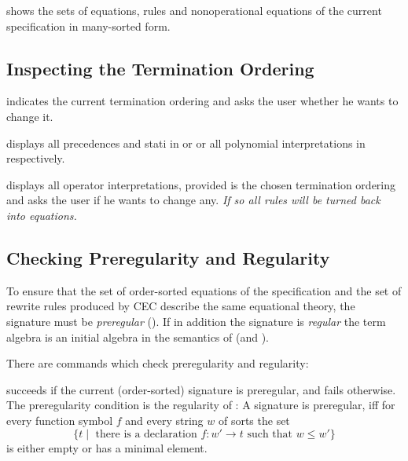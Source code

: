 \begin{command}
shows the sets of equations, rules and nonoperational equations of the 
current specification in many-sorted form.
\end{command}

\subsection{Inspecting the Termination Ordering}
\label{InspecTermination}

\begin{command}
indicates the current termination ordering and asks the user whether he wants to 
change it.
\end{command}

\begin{command}
displays all precedences and stati in  or  or
all polynomial interpretations in  respectively.
\end{command}

\begin{command}
displays all operator interpretations, provided  is the chosen termination
ordering and asks the user if he wants to change any. {\em If so all rules will be turned 
back into equations.}
\end{command}


\subsection{Checking Preregularity and Regularity}

To ensure that the set of order-sorted equations of the specification and
the set of rewrite rules produced by CEC describe the same equational
theory, the signature must be {\em preregular} ( \cite{SNGM87}).
If in addition the signature is {\em regular} the term algebra is an
initial algebra in the semantics of \cite{GM87} (and \cite{SNGM87}).

\noindent
There are commands which check preregularity and regularity:\medskip

\begin{command}
succeeds if the current (order-sorted) signature is preregular,
and fails otherwise.\\
The preregularity condition is the regularity of 
\cite{SNGM87}:
A signature is preregular, iff for every function symbol
$f$ and every string $w$ of sorts the set
$$   \{ t \mid \mbox{\ there is a declaration\ } f : w' \rightarrow t 
\mbox{\ such that\ } w \leq w' \} 
$$
is either empty or has a minimal element.
\end{command}

